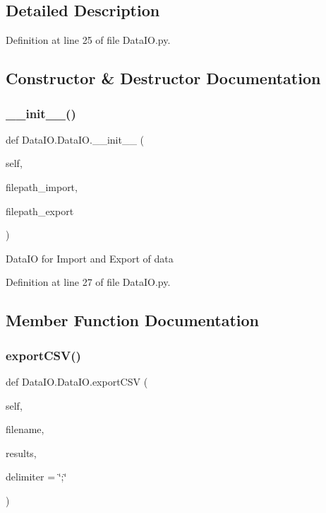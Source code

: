 \subsection{Detailed Description}


Definition at line 25 of file Data\+I\+O.\+py.



\subsection{Constructor \& Destructor Documentation}
\mbox{\label{class_data_i_o_1_1_data_i_o_a98bdded980e8bfc4ddaa1cd12a8392fe}} 
\subsubsection{\texorpdfstring{\+\_\+\+\_\+init\+\_\+\+\_\+()}{\_\_init\_\_()}}
{\footnotesize\ttfamily def Data\+I\+O.\+Data\+I\+O.\+\_\+\+\_\+init\+\_\+\+\_\+ (\begin{DoxyParamCaption}\item[{}]{self,  }\item[{}]{filepath\+\_\+import,  }\item[{}]{filepath\+\_\+export }\end{DoxyParamCaption})}

\begin{DoxyVerb}DataIO for Import and Export of data
\end{DoxyVerb}
 

Definition at line 27 of file Data\+I\+O.\+py.



\subsection{Member Function Documentation}
\mbox{\label{class_data_i_o_1_1_data_i_o_a945b9f613d7eb68756a1483c8d8d7419}} 
\subsubsection{\texorpdfstring{export\+C\+S\+V()}{exportCSV()}}
{\footnotesize\ttfamily def Data\+I\+O.\+Data\+I\+O.\+export\+C\+SV (\begin{DoxyParamCaption}\item[{}]{self,  }\item[{}]{filename,  }\item[{}]{results,  }\item[{}]{delimiter = {\ttfamily \char`\"{};\char`\"{}} }\end{DoxyParamCaption})}

